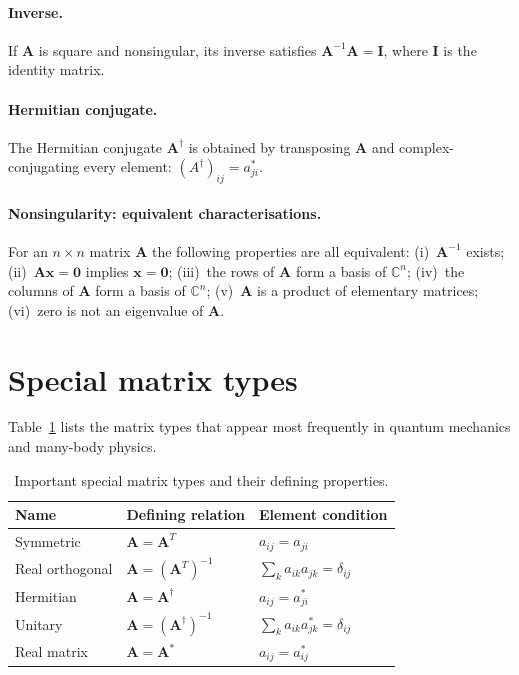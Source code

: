 \paragraph{Inverse.}
If $\bm{A}$ is square and nonsingular, its inverse satisfies
$\bm{A}^{-1}\bm{A}=\bm{I}$, where $\bm{I}$ is the identity matrix.

\paragraph{Hermitian conjugate.}
The Hermitian conjugate $\bm{A}^{\dagger}$ is obtained by transposing
$\bm{A}$ and complex-conjugating every element:
$(A^{\dagger})_{ij} = a_{ji}^{*}$.

\paragraph{Nonsingularity: equivalent characterisations.}
For an $n\times n$ matrix $\bm{A}$ the following properties are all
equivalent: (i)~$\bm{A}^{-1}$ exists; (ii)~$\bm{A}\bm{x}=\bm{0}$
implies $\bm{x}=\bm{0}$; (iii)~the rows of $\bm{A}$ form a basis of
$\mathbb{C}^n$; (iv)~the columns of $\bm{A}$ form a basis of
$\mathbb{C}^n$; (v)~$\bm{A}$ is a product of elementary matrices;
(vi)~zero is not an eigenvalue of $\bm{A}$.

\section{Special matrix types}
\label{sec:specialmat}

Table~\ref{tab:matrices} lists the matrix types that appear most
frequently in quantum mechanics and many-body physics.

\begin{table}[h]
\centering
\renewcommand{\arraystretch}{1.35}
\begin{tabular}{lll}
\toprule
\textbf{Name} & \textbf{Defining relation} & \textbf{Element condition} \\
\midrule
Symmetric     & $\bm{A}=\bm{A}^{T}$
              & $a_{ij}=a_{ji}$ \\
Real orthogonal & $\bm{A}=(\bm{A}^{T})^{-1}$
              & $\sum_k a_{ik}a_{jk}=\delta_{ij}$ \\
Hermitian     & $\bm{A}=\bm{A}^{\dagger}$
              & $a_{ij}=a_{ji}^{*}$ \\
Unitary       & $\bm{A}=(\bm{A}^{\dagger})^{-1}$
              & $\sum_k a_{ik}a_{jk}^{*}=\delta_{ij}$ \\
Real matrix   & $\bm{A}=\bm{A}^{*}$
              & $a_{ij}=a_{ij}^{*}$ \\
\bottomrule
\end{tabular}
\caption{Important special matrix types and their defining properties.}
\label{tab:matrices}
\end{table}

